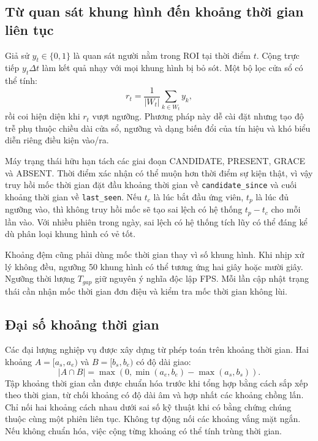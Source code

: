 \subsection{Từ quan sát khung hình đến khoảng thời gian liên tục}
Giả sử $y_t\in\{0,1\}$ là quan sát người nằm trong ROI tại thời điểm $t$. Cộng trực tiếp $y_t\Delta t$ làm kết quả nhạy với mọi khung hình bị bỏ sót. Một bộ lọc cửa sổ có thể tính:
\begin{equation}
 r_t=\frac{1}{|W_t|}\sum_{k\in W_t}y_k,
\end{equation}
rồi coi hiện diện khi $r_t$ vượt ngưỡng. Phương pháp này dễ cài đặt nhưng tạo độ trễ phụ thuộc chiều dài cửa sổ, ngưỡng và dạng biến đổi của tín hiệu và khó biểu diễn riêng điều kiện vào/ra.

Máy trạng thái hữu hạn tách các giai đoạn CANDIDATE, PRESENT, GRACE và ABSENT. Thời điểm xác nhận có thể muộn hơn thời điểm sự kiện thật, vì vậy truy hồi mốc thời gian đặt đầu khoảng thời gian về \texttt{candidate\_since} và cuối khoảng thời gian về \texttt{last\_seen}. Nếu $t_c$ là lúc bắt đầu ứng viên, $t_p$ là lúc đủ ngưỡng vào, thì không truy hồi mốc sẽ tạo sai lệch có hệ thống $t_p-t_c$ cho mỗi lần vào. Với nhiều phiên trong ngày, sai lệch có hệ thống tích lũy có thể đáng kể dù phân loại khung hình có vẻ tốt.

Khoảng đệm cũng phải dùng mốc thời gian thay vì số khung hình. Khi nhịp xử lý không đều, ngưỡng 50 khung hình có thể tương ứng hai giây hoặc mười giây. Ngưỡng thời lượng $T_{gap}$ giữ nguyên ý nghĩa độc lập FPS. Mỗi lần cập nhật trạng thái cần nhận mốc thời gian đơn điệu và kiểm tra mốc thời gian không lùi.

\subsection{Đại số khoảng thời gian}
Các đại lượng nghiệp vụ được xây dựng từ phép toán trên khoảng thời gian. Hai khoảng $A=[a_s,a_e)$ và $B=[b_s,b_e)$ có độ dài giao:
\begin{equation}
 |A\cap B|=\max\left(0,\min(a_e,b_e)-\max(a_s,b_s)\right).
\end{equation}
Tập khoảng thời gian cần được chuẩn hóa trước khi tổng hợp bằng cách sắp xếp theo thời gian, từ chối khoảng có độ dài âm và hợp nhất các khoảng chồng lấn. Chỉ nối hai khoảng cách nhau dưới sai số kỹ thuật khi có bằng chứng chúng thuộc cùng một phiên liên tục. Không tự động nối các khoảng vắng mặt ngắn. Nếu không chuẩn hóa, việc cộng từng khoảng có thể tính trùng thời gian.

